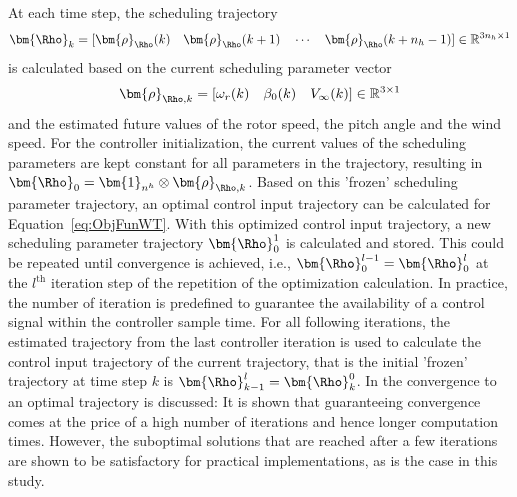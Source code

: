 At each time step, the scheduling trajectory 
\begin{align}
    \bm{\Rho}_{k}= [\bm{\rho}_{\Rho}(k) \quad \bm{\rho}_{\Rho}(k+1)\quad \cdots \quad \bm{\rho}_{\Rho} (k+n_h-1)] \in \mathbb{R}^{3n_h \times 1}
\end{align}
is calculated based on the current scheduling parameter vector
\begin{align*}
    \bm{\rho}_{\Rho,k} = [\omega_r(k)\quad \beta_0(k) \quad V_\infty(k)] \in \mathbb{R}^{3 \times 1}
\end{align*}
 and the estimated future values of the rotor speed, the pitch angle and the wind speed. For the controller initialization, the current values of the scheduling parameters are kept constant for all parameters in the trajectory, resulting in $\bm{\Rho}_0 = \bm{1}_{n^h} \otimes \bm{\rho}_{\Rho,k}$. Based on this 'frozen' scheduling parameter trajectory, an optimal control input trajectory can be calculated for Equation~\eqref{eq:ObjFunWT}. With this optimized control input trajectory, a new scheduling parameter trajectory $\bm{\Rho}_0^1$ is calculated and stored. This could be repeated until convergence is achieved, i.e., $\bm{\Rho}_0^{l-1} = \bm{\Rho}_0^l$ at the $l^\text{th}$ iteration step of the repetition of the optimization calculation. In practice, the number of iteration is predefined to guarantee the availability of a control signal within the controller sample time. For all following iterations, the estimated trajectory from the last controller iteration is used to calculate the control input trajectory of the current trajectory, that is the initial 'frozen' trajectory at time step $k$ is $\bm{\Rho}_{k-1}^{l} = \bm{\Rho}_k^0$. In \cite{hespe2021convergence} the convergence to an optimal trajectory is discussed: It is shown that guaranteeing convergence comes at the price of a high number of iterations and hence longer computation times. However, the suboptimal solutions that are reached after a few iterations are shown to be satisfactory for practical implementations, as is the case in this study.
 
